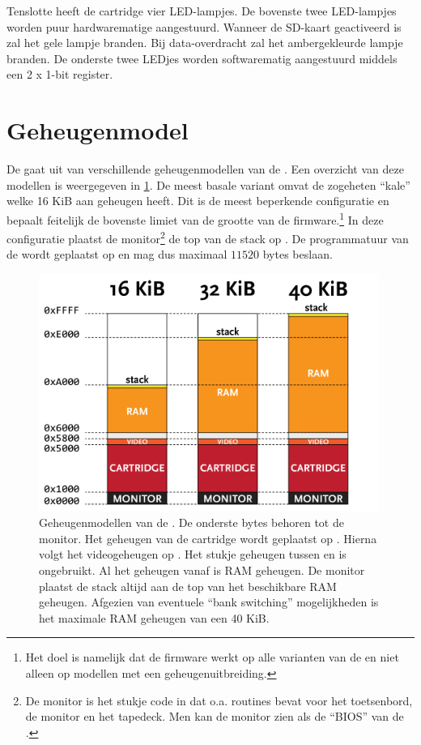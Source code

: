 Tenslotte heeft de  cartridge vier LED-lampjes. De bovenste twee LED-lampjes worden puur hardwarematige aangestuurd. Wanneer de SD-kaart geactiveerd is zal het gele lampje branden. Bij data-overdracht zal het ambergekleurde lampje branden. De onderste twee LEDjes worden softwarematig aangestuurd middels een 2 x 1-bit register.

%
%
%
\section{Geheugenmodel}
\label{sec:memory-model}


De \product gaat uit van verschillende geheugenmodellen van de . Een overzicht van deze modellen is weergegeven in \cref{fig:memory-models}. De meest basale variant omvat de zogeheten ``kale''  welke 16 KiB aan geheugen heeft. Dit is de meest beperkende configuratie en bepaalt feitelijk de bovenste limiet van de grootte van de firmware.\footnote{Het doel is namelijk dat de firmware werkt op alle varianten van de  en niet alleen op modellen met een geheugenuitbreiding.} In deze configuratie plaatst de monitor\footnote{De monitor is het stukje code in  dat o.a. routines bevat voor het toetsenbord, de monitor en het tapedeck. Men kan de monitor zien als de ``BIOS'' van de .} de top van de stack op . De programmatuur van de \product wordt geplaatst op  en mag dus maximaal $11520$ bytes beslaan.

\begin{figure}[h!]
    \centering
    \includegraphics[width=0.99\textwidth]{img/memory_models.png}
    \caption{Geheugenmodellen van de . De onderste  bytes behoren tot de monitor. Het geheugen van de  cartridge wordt geplaatst op . Hierna volgt het videogeheugen op . Het stukje geheugen tussen  en  is ongebruikt. Al het geheugen vanaf  is RAM geheugen. De monitor plaatst de stack altijd aan de top van het beschikbare RAM geheugen. Afgezien van eventuele ``bank switching'' mogelijkheden is het maximale RAM geheugen van een  40 KiB.}
    \label{fig:memory-models}
\end{figure}

